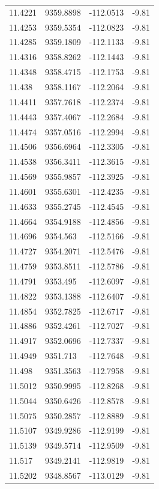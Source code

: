 \begin{table}[H]
\begin{tabular}{llll}
11.4221 & 9359.8898 & -112.0513 & -9.81 \\
11.4253 & 9359.5354 & -112.0823 & -9.81 \\
11.4285 & 9359.1809 & -112.1133 & -9.81 \\
11.4316 & 9358.8262 & -112.1443 & -9.81 \\
11.4348 & 9358.4715 & -112.1753 & -9.81 \\
11.438 & 9358.1167 & -112.2064 & -9.81 \\
11.4411 & 9357.7618 & -112.2374 & -9.81 \\
11.4443 & 9357.4067 & -112.2684 & -9.81 \\
11.4474 & 9357.0516 & -112.2994 & -9.81 \\
11.4506 & 9356.6964 & -112.3305 & -9.81 \\
11.4538 & 9356.3411 & -112.3615 & -9.81 \\
11.4569 & 9355.9857 & -112.3925 & -9.81 \\
11.4601 & 9355.6301 & -112.4235 & -9.81 \\
11.4633 & 9355.2745 & -112.4545 & -9.81 \\
11.4664 & 9354.9188 & -112.4856 & -9.81 \\
11.4696 & 9354.563 & -112.5166 & -9.81 \\
11.4727 & 9354.2071 & -112.5476 & -9.81 \\
11.4759 & 9353.8511 & -112.5786 & -9.81 \\
11.4791 & 9353.495 & -112.6097 & -9.81 \\
11.4822 & 9353.1388 & -112.6407 & -9.81 \\
11.4854 & 9352.7825 & -112.6717 & -9.81 \\
11.4886 & 9352.4261 & -112.7027 & -9.81 \\
11.4917 & 9352.0696 & -112.7337 & -9.81 \\
11.4949 & 9351.713 & -112.7648 & -9.81 \\
11.498 & 9351.3563 & -112.7958 & -9.81 \\
11.5012 & 9350.9995 & -112.8268 & -9.81 \\
11.5044 & 9350.6426 & -112.8578 & -9.81 \\
11.5075 & 9350.2857 & -112.8889 & -9.81 \\
11.5107 & 9349.9286 & -112.9199 & -9.81 \\
11.5139 & 9349.5714 & -112.9509 & -9.81 \\
11.517 & 9349.2141 & -112.9819 & -9.81 \\
11.5202 & 9348.8567 & -113.0129 & -9.81 \\

\end{tabular}
\end{table}

